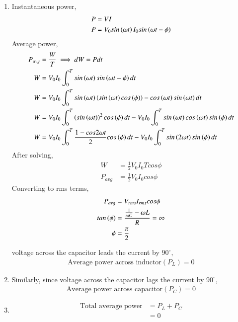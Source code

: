 \documentclass[a4,12pt,onecolumn]{IEEEtran}
\begin{document}
\begin{enumerate}
    \item Instantaneous power,
    \begin{align}
        P &= VI \\
        P &= V_0sin\left(\omega t\right) I_0 sin\left(\omega t - \phi\right)
    \end{align}
    Average power,
    \begin{align}
    P_{avg} &= \frac{W}{T} \implies dW = Pdt \\
    W &= V_0 I_0 \int_{0}^{T} sin\left(\omega t\right) sin\left(\omega t - \phi\right) dt \\
     W &= V_0 I_0 \int_{0}^{T} sin\left(\omega t\right)\left(sin\left(\omega t\right)cos\left(\phi\right)\right) - cos\left(\omega t\right)sin\left(\omega t\right) dt\\
       W &= V_0 I_0 \int_{0}^{T} \left(sin\left(\omega t\right)\right)^2 cos\left(\phi\right)dt - V_0 I_0\int_{0}^{T}sin\left(\omega t\right)cos\left(\omega t\right)sin\left(\phi\right) dt\\
        W &= V_0 I_0 \int_{0}^{T} \frac{1-cos{2 \omega t}}{2} cos\left(\phi\right)dt - V_0 I_0\int_{0}^{T}sin\left(2 \omega t\right)sin\left(\phi\right)dt
    \end{align}
After solving,
    \begin{align}
        W &= \frac{1}{2} V_0 I_0 T cos{\phi} \\
        P_{avg} &=\frac{1}{2} V_0 I_0 cos{\phi}
    \end{align}
    Converting to rms terms,
    \begin{align}
      P_{avg} &= V_{rms} I_{rms} cos{\phi} \\
      tan\left(\phi\right) &= \frac{\frac{1}{\omega C} -\omega L}{R} = \infty\\
      \phi &= \frac{\pi}{2} 
    \end{align}

 voltage across the capacitor leads the current by $90^\circ$,
    \begin{align}
        \text{Average power across inductor} (P_L) = 0
    \end{align}

    \item 
    Similarly, since voltage across the capacitor lags the current by $90^\circ$,
    \begin{align}
        \text{Average power across capacitor} (P_C) = 0
    \end{align}

    \item 
    \begin{align}
        \text{Total average power} &= P_L + P_C \\
        &= 0
    \end{align}
\end{enumerate}
\end{document}
